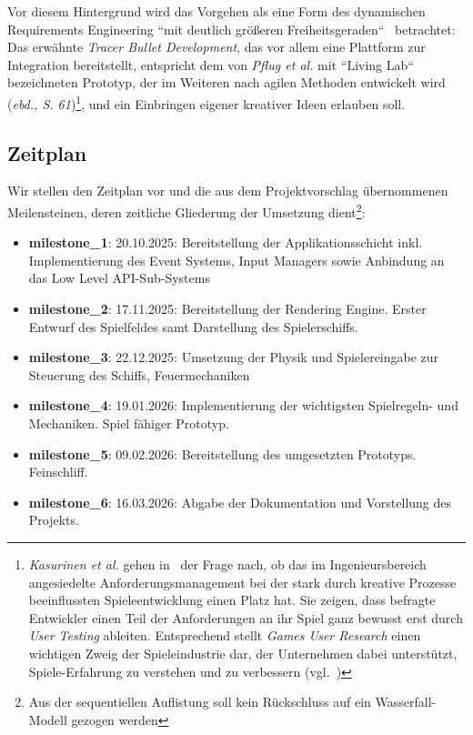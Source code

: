 Vor diesem Hintergrund wird das Vorgehen als eine Form des dynamischen Requirements Engineering ``mit deutlich größeren Freiheitsgeraden``~\cite[60]{MRP21} betrachtet: Das erwähnte \textit{Tracer Bullet Development}, das vor allem eine Plattform zur Integration bereitstellt, entspricht dem von \textit{Pflug et al.} mit ``Living Lab`` bezeichneten Prototyp, der im Weiteren nach agilen Methoden entwickelt wird (\textit{ebd., S. 61})\footnote{
    \textit{Kasurinen et al.} gehen in~\cite[]{KMS14} der Frage nach, ob das im Ingenieursbereich angesiedelte Anforderungsmanagement bei der stark durch kreative Prozesse beeinflussten Spieleentwicklung einen Platz hat. Sie zeigen, dass befragte Entwickler einen Teil der Anforderungen an ihr Spiel ganz bewusst erst durch \textit{User Testing} ableiten. Entsprechend stellt \textit{Games User Research} einen wichtigen Zweig der Spieleindustrie dar, der Unternehmen dabei unterstützt, Spiele-Erfahrung zu verstehen und zu verbessern (vgl.~\cite[26]{Zam18})
}, und ein Einbringen eigener kreativer Ideen erlauben soll.\\

\subsection{Zeitplan}

Wir stellen den Zeitplan vor und die aus dem Projektvorschlag übernommenen Meilensteinen, deren zeitliche Gliederung der Umsetzung dient\footnote{Aus der sequentiellen Auflistung soll kein Rückschluss auf ein Wasserfall-Modell gezogen werden}:

\vspace{2mm}
\begin{itemize}
    \itemsep0.5em
    \item \textbf{milestone\_1}: 20.10.2025: Bereitstellung der Applikationsschicht inkl. Implementierung des Event
    Systems, Input Managers sowie Anbindung an das Low Level API-Sub-Systems
    \item \textbf{milestone\_2}: 17.11.2025: Bereitstellung der Rendering Engine. Erster Entwurf des Spielfeldes
    samt Darstellung des Spielerschiffs.
    \item \textbf{milestone\_3}: 22.12.2025: Umsetzung der Physik und Spielereingabe zur Steuerung des Schiffs,
    Feuermechaniken
    \item \textbf{milestone\_4}: 19.01.2026: Implementierung der wichtigsten Spielregeln- und Mechaniken. Spiel
    fähiger Prototyp.
    \item \textbf{milestone\_5}: 09.02.2026: Bereitstellung des umgesetzten Prototyps. Feinschliff.
    \item \textbf{milestone\_6}: 16.03.2026: Abgabe der Dokumentation und Vorstellung des Projekts.
\end{itemize}
\vspace{2mm}


